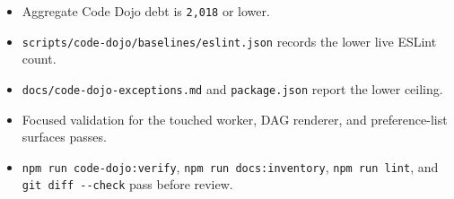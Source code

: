 \begin{itemize}
\item
  Aggregate Code Dojo debt is \texttt{2\allowbreak{},\allowbreak{}0\allowbreak{}1\allowbreak{}8} or lower.
\item
  \texttt{s\allowbreak{}c\allowbreak{}r\allowbreak{}i\allowbreak{}p\allowbreak{}t\allowbreak{}s\allowbreak{}/\allowbreak{}c\allowbreak{}o\allowbreak{}d\allowbreak{}e\allowbreak{}-\allowbreak{}d\allowbreak{}o\allowbreak{}j\allowbreak{}o\allowbreak{}/\allowbreak{}b\allowbreak{}a\allowbreak{}s\allowbreak{}e\allowbreak{}l\allowbreak{}i\allowbreak{}n\allowbreak{}e\allowbreak{}s\allowbreak{}/\allowbreak{}e\allowbreak{}s\allowbreak{}l\allowbreak{}i\allowbreak{}n\allowbreak{}t\allowbreak{}.\allowbreak{}j\allowbreak{}s\allowbreak{}o\allowbreak{}n} records the lower live ESLint count.
\item
  \texttt{d\allowbreak{}o\allowbreak{}c\allowbreak{}s\allowbreak{}/\allowbreak{}c\allowbreak{}o\allowbreak{}d\allowbreak{}e\allowbreak{}-\allowbreak{}d\allowbreak{}o\allowbreak{}j\allowbreak{}o\allowbreak{}-\allowbreak{}e\allowbreak{}x\allowbreak{}c\allowbreak{}e\allowbreak{}p\allowbreak{}t\allowbreak{}i\allowbreak{}o\allowbreak{}n\allowbreak{}s\allowbreak{}.\allowbreak{}m\allowbreak{}d} and \texttt{p\allowbreak{}a\allowbreak{}c\allowbreak{}k\allowbreak{}a\allowbreak{}g\allowbreak{}e\allowbreak{}.\allowbreak{}j\allowbreak{}s\allowbreak{}o\allowbreak{}n} report the lower ceiling.
\item
  Focused validation for the touched worker, DAG renderer, and preference-list surfaces passes.
\item
  \texttt{n\allowbreak{}p\allowbreak{}m\allowbreak{} \allowbreak{}r\allowbreak{}u\allowbreak{}n\allowbreak{} \allowbreak{}c\allowbreak{}o\allowbreak{}d\allowbreak{}e\allowbreak{}-\allowbreak{}d\allowbreak{}o\allowbreak{}j\allowbreak{}o\allowbreak{}:\allowbreak{}v\allowbreak{}e\allowbreak{}r\allowbreak{}i\allowbreak{}f\allowbreak{}y}, \texttt{n\allowbreak{}p\allowbreak{}m\allowbreak{} \allowbreak{}r\allowbreak{}u\allowbreak{}n\allowbreak{} \allowbreak{}d\allowbreak{}o\allowbreak{}c\allowbreak{}s\allowbreak{}:\allowbreak{}i\allowbreak{}n\allowbreak{}v\allowbreak{}e\allowbreak{}n\allowbreak{}t\allowbreak{}o\allowbreak{}r\allowbreak{}y}, \texttt{n\allowbreak{}p\allowbreak{}m\allowbreak{} \allowbreak{}r\allowbreak{}u\allowbreak{}n\allowbreak{} \allowbreak{}l\allowbreak{}i\allowbreak{}n\allowbreak{}t}, and \texttt{g\allowbreak{}i\allowbreak{}t\allowbreak{} \allowbreak{}d\allowbreak{}i\allowbreak{}f\allowbreak{}f\allowbreak{} \allowbreak{}-\allowbreak{}-\allowbreak{}c\allowbreak{}h\allowbreak{}e\allowbreak{}c\allowbreak{}k} pass before review.
\end{itemize}

